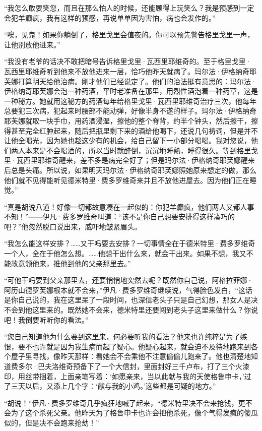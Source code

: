 \par “我怎么敢耍笑您，而且在那么怕人的时候，还能顾得上玩笑么？我是预感到一定会犯羊癫疯，我有这样的预感，再说单单因为害怕，病也会发作的。”
\par “唉，见鬼！如果你躺倒了，格里戈里会值夜的。你可以预先警告格里戈里一声，让他别放他进来。”
\par “我没有老爷的话决不敢把暗号告诉格里戈里·瓦西里耶维奇的。至于格里戈里·瓦西里耶维奇听到他来不放他进来一层，恰巧他昨天就病了。玛尔法·伊格纳奇耶芙娜打算明天给他治病。刚才他们已经说定了。他们的治法挺有意思的：玛尔法·伊格纳奇耶芙娜会泡一种药酒，平时老准备在那里，用烈性酒泡着一种药草，这是一种秘方。她就用这秘方的药酒每年给格里戈里·瓦西里耶维奇治疗三次，他每年总要犯三次病，犯起来时腰部不能动弹，好像半身不遂的样子。玛尔法·伊格纳奇耶芙娜就取一块手巾，用药酒浸湿，擦他的整个脊背，约半个钟头，然后擦干，擦得甚至完全红肿起来，随后把瓶里剩下来的酒给他喝下，还说几句祷词，但是并不让他全喝光，因为她也趁这少有的机会，给自己留下一小部分喝喝。我对您说，他们两人本来是不会喝酒的，所以当时就醉倒，沉沉地睡熟，睡得很久。等到格里戈里·瓦西里耶维奇醒来，差不多是病完全好了；但是玛尔法·伊格纳奇耶芙娜醒来后总是头痛。所以说，如果明天玛尔法·伊格纳奇耶芙娜照她原来想定的做，那么他们就不见得能听见德米特里·费多罗维奇来并且不放他进屋去。因为他们正在睡觉。”
\par “真是胡说八道！好像一切都故意凑在一起似的：你犯羊癫疯，他们两人又都人事不知！”——伊凡·费多罗维奇叫道：“该不是你自己想要安排得这样凑巧的吧？”他忽然脱口说出来，威吓地皱紧眉头。
\par “我怎么能这样安排？……又干吗要去安排？一切事情全在于德米特里·费多罗维奇一个人，全在于他怎么想。……他想干出什么来，就会干出来。如果不想，我又不能故意领他来，推他到他的父亲那里去。”
\par “可他干吗要到父亲那里去，还要悄悄地突然去呢？既然你自己说，阿格拉菲娜·阿历山德罗芙娜根本就不会来，”伊凡·费多罗维奇继续说，气得脸色发白，“这话是你自己说的，我在这里呆了一段时间，也深信老头子只是自己幻想，那女人是决不会到他这里来的。既然她不会来，德米特里还要闯到老头子这里来做什么？你说吧！我倒要听听你的看法。”
\par “您自己知道他为什么要到这里来，何必要听我的看法？他来也许纯粹是为了嫉恨，要不也许就是因为我生病而起了疑心。他疑心起来，就会迫不及待地跑来到各个屋子里寻找，像昨天那样：看她会不会乘他不注意偷偷儿跑来了。他也清楚地知道费多尔·巴夫洛维奇预备下了一个大信封，里面封好三千卢布，打了三个火漆印，用丝带捆着，上面亲笔写着：‘如愿亲来，当以此献与我的天使格鲁申卡，’过了三天以后，又添上几个字：‘献与我的小鸡。’这些都是可疑的地方。”
\par “胡说！”伊凡·费多罗维奇几乎疯狂地喊了起来，“德米特里决不会来抢钱，更不会为了这个杀死父亲。他昨天为了格鲁申卡也许会把他杀死，像个气得发疯的傻瓜似的，但是决不会跑来抢劫！”
